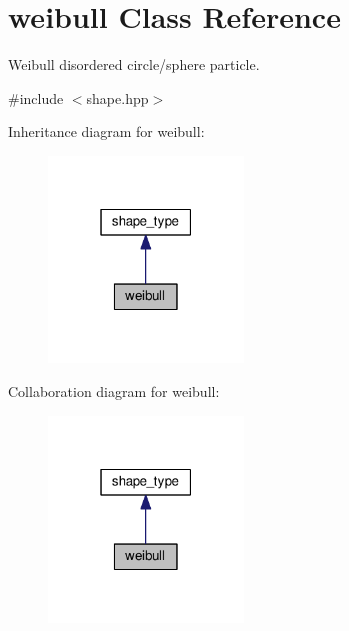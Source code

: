 \hypertarget{classweibull}{}\section{weibull Class Reference}
\label{classweibull}


Weibull disordered circle/sphere particle.  




{\ttfamily \#include $<$shape.\+hpp$>$}



Inheritance diagram for weibull\+:
\nopagebreak
\begin{figure}[H]
\begin{center}
\leavevmode
\includegraphics[width=147pt]{d2/d07/classweibull__inherit__graph}
\end{center}
\end{figure}


Collaboration diagram for weibull\+:
\nopagebreak
\begin{figure}[H]
\begin{center}
\leavevmode
\includegraphics[width=147pt]{db/d7a/classweibull__coll__graph}
\end{center}
\end{figure}
